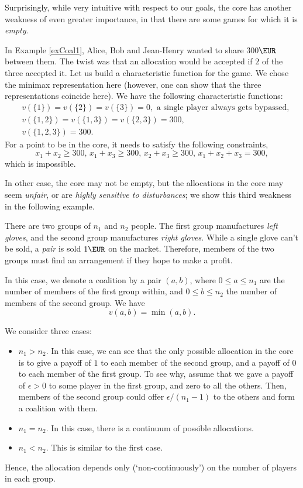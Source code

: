 Surprisingly, while very intuitive with respect to our goals, the core has another weakness of even greater importance, in that there are some games for which it is \emph{empty}.
\begin{example}
In Example \ref{exCoal1}, Alice, Bob and Jean-Henry wanted to share 300$\EUR$ between them. The twist was that an allocation would be accepted if $2$ of the three accepted it.
Let us build a characteristic function for the game. We chose the minimax representation here (however, one can show that the three representations coincide here).
We have the following characteristic functions:
$$
\begin{aligned}
&v(\{1\}) = v(\{2\}) = v(\{3\}) = 0, \text{ a single player always gets bypassed,}\\
&v(\{1,2\}) = v(\{1,3\}) = v(\{2,3\}) = 300, \\
&v(\{1,2,3\}) = 300.
\end{aligned}
$$
For a point to be in the core, it needs to satisfy the following constraints,
$$x_1 + x_2 \geq 300, \, x_1 + x_3 \geq 300, \, x_2 + x_3 \geq 300, \, x_1 + x_2 + x_3 = 300, $$
which is impossible.
\end{example}

In other case, the core may not be empty, but the allocations in the core may seem \emph{unfair}, or are \emph{highly sensitive to disturbances}; we show this third weakness in the following example.
\begin{example}
There are two groups of $n_1$ and $n_2$ people. The first group manufactures \emph{left gloves}, and the second group manufactures \emph{right gloves}. While a single glove can't be sold, a \emph{pair} is sold $1\EUR$ on the market. Therefore, members of the two groups must find an arrangement if they hope to make a profit.

In this case, we denote a coalition by a pair $(a,b)$, where $0 \leq  a \leq n_1$ are the number of members of the first group within, and $0 \leq b \leq n_2$ the number of members of the second group.
We have $$v(a,b) = \min(a,b). $$

We consider three cases:
\begin{itemize}
\item $n_1 > n_2$. In this case, we can see that the only possible allocation in the core is to give a payoff of $1$ to each member of the second group, and a payoff of $0$ to each member of the first group.
To see why, assume that we gave a payoff of $\epsilon > 0$ to some player in the first group, and zero to all the others. Then, members of the second group could offer $\epsilon/(n_1 - 1)$ to the others and form a coalition with them.
\item $n_1 = n_2$. In this case, there is a continuum of possible allocations.
\item $n_1 < n_2$. This is similar to the first case.
\end{itemize}
Hence, the allocation depends only (`non-continuously') on the number of players in each group.
\end{example}

